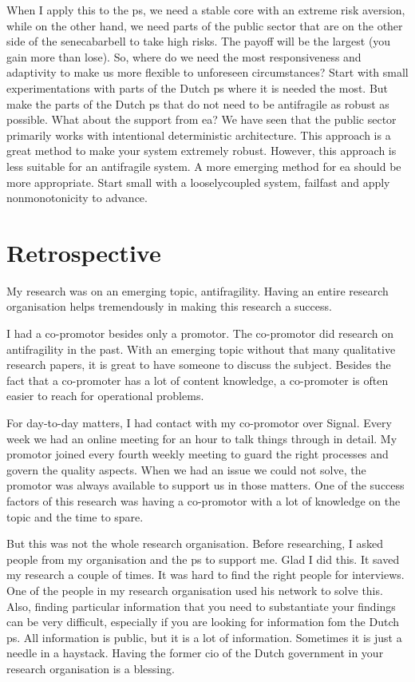 When I apply this to the \gls{ps}, we need a stable core with an extreme risk aversion, while on the other hand, we need parts of the public sector that are on the other side of the \gls{senecabarbell} to take high risks. The payoff will be the largest (you gain more than lose). So, where do we need the most responsiveness and adaptivity to make us more flexible to unforeseen circumstances? Start with small experimentations with parts of the Dutch \gls{ps} where it is needed the most. But make the parts of the Dutch \gls{ps} that do not need to be \gls{antifragile} as \gls{robust} as possible. What about the support from \acrlong{ea}? We have seen that the public sector primarily works with intentional deterministic architecture. This approach is a great method to make your system extremely robust. However, this approach is less suitable for an \gls{antifragile} system. A more emerging method for \acrlong{ea} should be more appropriate. Start small with a \gls{looselycoupled} system, \gls{failfast} and apply \gls{nonmonotonicity} to advance.

\section{Retrospective}
\label{sec:retrospective}
My research was on an emerging topic, \gls{antifragility}. Having an entire research organisation helps tremendously in making this research a success. 

I had a co-promotor besides only a promotor. The co-promotor did research on antifragility in the past. With an emerging topic without that many qualitative research papers, it is great to have someone to discuss the subject. Besides the fact that a co-promoter has a lot of content knowledge, a co-promoter is often easier to reach for operational problems. 

For day-to-day matters, I had contact with my co-promotor over Signal. Every week we had an online meeting for an hour to talk things through in detail. My promotor joined every fourth weekly meeting to guard the right processes and govern the quality aspects. When we had an issue we could not solve, the promotor was always available to support us in those matters. One of the success factors of this research was having a co-promotor with a lot of knowledge on the topic and the time to spare.

But this was not the whole research organisation. Before researching, I asked people from my organisation and the \gls{ps} to support me. Glad I did this. It saved my research a couple of times. It was hard to find the right people for interviews. One of the people in my research organisation used his network to solve this. Also, finding particular information that you need to substantiate your findings can be very difficult, especially if you are looking for information fom the Dutch \gls{ps}. All information is public, but it is a lot of information. Sometimes it is just a needle in a haystack. Having the former \acrshort{cio} of the Dutch government in your research organisation is a blessing.

